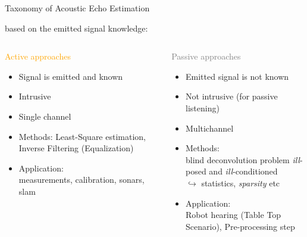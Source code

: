 \begin{frame}{Taxonomy of Acoustic Echo Estimation}

    \begin{block}{\mytriag based on the emitted signal knowledge:}
    \vspace{1em}
    \small
    \begin{columns}[T,onlytextwidth] %
        \begin{column}{.48\textwidth}
            \textcolor{orange}{Active approaches}
            \begin{itemize}
                \item Signal is emitted and known
                \item Intrusive
                \item Single channel
                \item Methods:
                Least-Square estimation, Inverse Filtering (Equalization)
                \item Application:
                \\measurements, calibration, sonars, slam
            \end{itemize}
        \end{column}%
        \hfill%
        \begin{column}{.48\textwidth}
            \textcolor{gray}{Passive approaches}
            \begin{itemize}
                \item Emitted signal is \alert{not} known
                \item \alert{Not} intrusive (for passive listening)
                \item Multichannel
                \item Methods:
                \\\alert{blind} deconvolution problem
                \textit{ill}-posed and \textit{ill}-conditioned
                \\$\hookrightarrow$ statistics, \textit{sparsity} etc
                \item Application:
                \\Robot hearing (Table Top Scenario), Pre-processing step
            \end{itemize}
        \end{column}%
        \end{columns}
    \end{block}



\end{frame}

